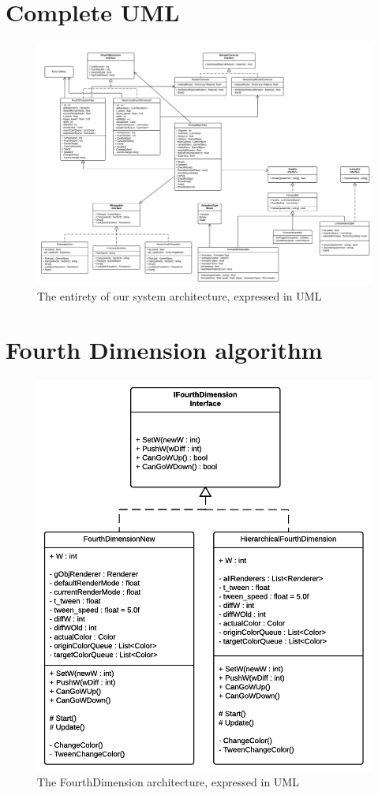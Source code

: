 \begin{appendices}
	\section{Complete UML}
	\label{completeUML}
	\begin{figure}[h!]
		\centering
		\includegraphics[angle=90,origin=c,scale=0.5]{pictures/4D-Puzzle-Flowchart.png}
		\caption{The entirety of our system architecture, expressed in UML}
	\end{figure}
	
	\pagebreak
	\section{Fourth Dimension algorithm}
	\label{fourthOnlyUML}
	\begin{figure}[h!]
		\centering
		\includegraphics[scale=1]{pictures/FourthDimensionUML.png}
		\caption{The FourthDimension architecture, expressed in UML}
	\end{figure}
	

\end{appendices}
